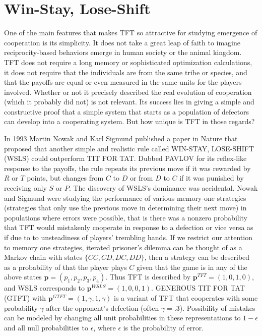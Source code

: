 \section {Win-Stay, Lose-Shift}
One of the main features that makes TFT so attractive for studying emergence of cooperation is its simplicity. It does not take a great leap of faith to imagine reciprocity-based behaviors emerge in human society or the animal kingdom. TFT does not require a long memory or sophisticated optimization calculations, it does not require that the individuals are from the same tribe or species, and that the payoffs are equal or even measured in the same units for the players involved. Whether or not it precisely described the real evolution of cooperation (which it probably did not) is not relevant. Its success lies in giving a simple and constructive proof that a simple system that starts as a population of defectors can develop into a cooperating system. But how unique is TFT in those regards?

In 1993 Martin Nowak and Karl Sigmund published a paper in Nature \cite{Nowak1993} that proposed that another simple and realistic rule called WIN-STAY, LOSE-SHIFT (WSLS) could outperform TIT FOR TAT. Dubbed PAVLOV for its reflex-like response to the payoffs, the rule repeats its previous move if it was rewarded by $R$ or $T$ points, but changes from $C$ to $D$ or from $D$ to $C$ if it was punished by receiving only $S$ or $P$. The discovery of WSLS's dominance was accidental. Nowak and Sigmund were studying the performance of various memory-one strategies (strategies that only use the previous move in determining their next move) in populations where errors were possible, that is there was a nonzero probability that TFT would mistakenly cooperate in response to a defection or vice versa as if due to to unsteadiness of players' trembling hands. If we restrict our attention to memory one strategies, iterated prisoner's dilemma can be thought of as a Markov chain with states $\{CC, CD, DC, DD\}$, then a strategy can be described as a probability of that the player plays $C$ given that the game is in any of the above states $\mathbf{p} = (p_1, p_2, p_3, p_4)$. Thus TFT is described by $\mathbf{p}^{TFT} = (1, 0, 1, 0)$, and WSLS corresponds to $\mathbf{p}^{WSLS} = (1, 0, 0, 1)$. GENEROUS TIT FOR TAT (GTFT) with $\mathbf{p}^{GTFT} = (1, \gamma, 1, \gamma)$ is a variant of TFT that cooperates with some probability $\gamma$ after the opponent's defection (often $\gamma = .3$). Possibility of mistakes can be modeled by changing all unit probabilities in these representations to $1-\epsilon$ and all null probabilities to $\epsilon$, where $\epsilon$ is the probability of error.

